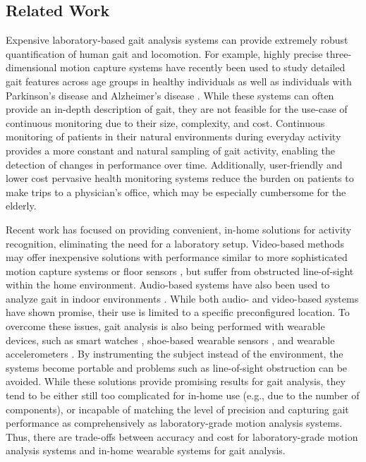 \documentclass[12pt]{report}
\begin{document}
\subsection{Related Work}
Expensive laboratory-based gait analysis systems can provide extremely robust quantification of human gait and locomotion. For example, highly precise three-dimensional motion capture systems have recently been used to study detailed gait features across age groups in healthy individuals \cite{Chien2015TheIndividuals} as well as individuals with Parkinson's disease \cite{Corona2016QuantitativeDisease} and Alzheimer's disease \cite{Rucco2017Spatio-temporalCapture}. While these systems can often provide an in-depth description of gait, they are not feasible for the use-case of continuous monitoring due to their size, complexity, and cost. Continuous monitoring of patients in their natural environments during everyday activity provides a more constant and natural sampling of gait activity, enabling the detection of changes in performance over time. Additionally, user-friendly and lower cost pervasive health monitoring systems reduce the burden on patients to make trips to a physician's office, which may be especially cumbersome for the elderly.

Recent work has focused on providing convenient, in-home solutions for activity recognition, eliminating the need for a laboratory setup. Video-based methods may offer inexpensive solutions with performance similar to more sophisticated motion capture systems or floor sensors \cite{Wang2013TowardAdults}, but suffer from obstructed line-of-sight within the home environment. Audio-based systems have also been used to analyze gait in indoor environments \cite{Geiger2013Gait-basedFeatures, Altaf2015AcousticSounds}. While both audio- and video-based systems have shown promise, their use is limited to a specific preconfigured location. To overcome these issues, gait analysis is also being performed with wearable devices, such as smart watches \cite{Suh2016Kalman-Filter-BasedSmart-Watch}, shoe-based wearable sensors \cite{Mariani2013On-shoeDisease}, and wearable accelerometers \cite{Fortune2014ValidityVelocities, Hartmann2009ConcurrentAdults, DelDin2016ValidationUse, Chung2012GaitAccelerometer}. By instrumenting the subject instead of the environment, the systems become portable and problems such as line-of-sight obstruction can be avoided. While these solutions provide promising results for gait analysis, they tend to be either still too complicated for in-home use (e.g., due to the number of components), or incapable of matching the level of precision and capturing gait performance as comprehensively as  laboratory-grade motion analysis systems. Thus, there are trade-offs between accuracy and cost for laboratory-grade motion analysis systems and in-home wearable systems for gait analysis.
\end{document}
